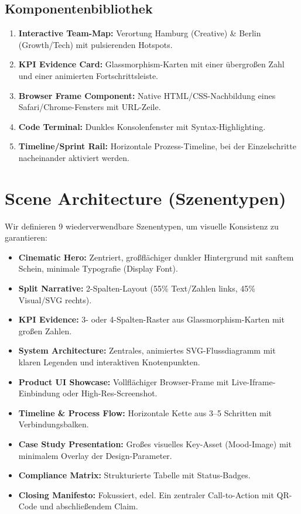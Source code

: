 \documentclass[11pt,a4paper]{article}
\begin{document}
\subsection{Komponentenbibliothek}
\begin{enumerate}
    \item \textbf{Interactive Team-Map:} Verortung Hamburg (Creative) \& Berlin (Growth/Tech) mit pulsierenden Hotspots.
    \item \textbf{KPI Evidence Card:} Glassmorphism-Karten mit einer übergroßen Zahl und einer animierten Fortschrittsleiste.
    \item \textbf{Browser Frame Component:} Native HTML/CSS-Nachbildung eines Safari/Chrome-Fensters mit URL-Zeile.
    \item \textbf{Code Terminal:} Dunkles Konsolenfenster mit Syntax-Highlighting.
    \item \textbf{Timeline/Sprint Rail:} Horizontale Prozess-Timeline, bei der Einzelschritte nacheinander aktiviert werden.
\end{enumerate}

\newpage

\section{Scene Architecture (Szenentypen)}
Wir definieren 9 wiederverwendbare Szenentypen, um visuelle Konsistenz zu garantieren:
\begin{itemize}
    \item \textbf{Cinematic Hero:} Zentriert, großflächiger dunkler Hintergrund mit sanftem Schein, minimale Typografie (Display Font).
    \item \textbf{Split Narrative:} 2-Spalten-Layout (55\% Text/Zahlen links, 45\% Visual/SVG rechts).
    \item \textbf{KPI Evidence:} 3- oder 4-Spalten-Raster aus Glassmorphism-Karten mit großen Zahlen.
    \item \textbf{System Architecture:} Zentrales, animiertes SVG-Flussdiagramm mit klaren Legenden und interaktiven Knotenpunkten.
    \item \textbf{Product UI Showcase:} Vollflächiger Browser-Frame mit Live-Iframe-Einbindung oder High-Res-Screenshot.
    \item \textbf{Timeline \& Process Flow:} Horizontale Kette aus 3--5 Schritten mit Verbindungsbalken.
    \item \textbf{Case Study Presentation:} Großes visuelles Key-Asset (Mood-Image) mit minimalem Overlay der Design-Parameter.
    \item \textbf{Compliance Matrix:} Strukturierte Tabelle mit Status-Badges.
    \item \textbf{Closing Manifesto:} Fokussiert, edel. Ein zentraler Call-to-Action mit QR-Code und abschließendem Claim.
\end{itemize}
\end{document}
